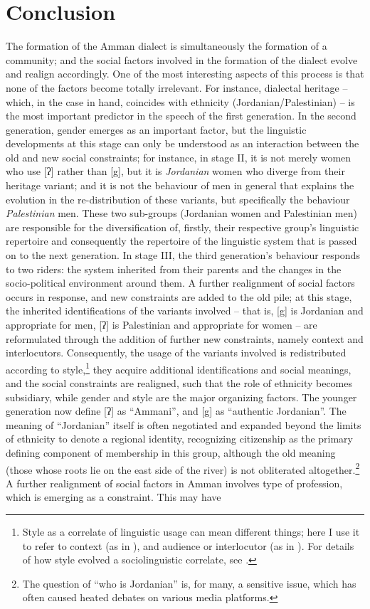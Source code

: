 \documentclass[output=paper]{langsci/langscibook}
\begin{document}
\section{Conclusion}

The formation of the Amman dialect is simultaneously the formation of a community; and the social factors involved in the formation of the dialect evolve and realign accordingly. One of the most interesting aspects of this process is that none of the factors become totally irrelevant. For instance, dialectal heritage – which, in the case in hand, coincides with ethnicity (Jordanian/Palestinian) – is the most important predictor in the speech of the first generation. In the second generation, gender emerges as an important factor, but the linguistic developments at this stage can only be understood as an interaction between the old and new social constraints; for instance, in stage II, it is not merely women who use [ʔ] rather than [g], but it is \textit{Jordanian} women who diverge from their heritage variant; and it is not the behaviour of men in general that explains the evolution in the re-distribution of these variants, but specifically the behaviour \textit{Palestinian} men. These two sub-groups (Jordanian women and Palestinian men) are responsible for the diversification of, firstly, their respective group’s linguistic repertoire and consequently the repertoire of the linguistic system that is passed on to the next generation. In stage III, the third generation’s behaviour responds to two riders: the system inherited from their parents and the changes in the socio-political environment around them. A further realignment of social factors occurs in response, and new constraints are added to the old pile; at this stage, the inherited identifications of the variants involved – that is, [g] is Jordanian and appropriate for men, [ʔ] is Palestinian and appropriate for women – are reformulated through the addition of further new constraints, namely context and interlocutors. Consequently, the usage of the variants involved is redistributed according to style,\footnote{Style as a correlate of linguistic usage can mean different things; here I use it to refer to context (as in \citealt{Labov1972}), and audience or interlocutor (as in \citealt{Bell1984}). For details of how style evolved a sociolinguistic correlate, see \citet{EckertRickford2001}.} they acquire additional identifications and social meanings, and the social constraints are realigned, such that the role of ethnicity becomes subsidiary, while gender and style are the major organizing factors. The younger generation now define [ʔ] as ``Ammani'', and [g] as ``authentic Jordanian''. The meaning of ``Jordanian'' itself is often negotiated and expanded beyond the limits of ethnicity to denote a regional identity, recognizing citizenship as the primary defining component of membership in this group, although the old meaning (those whose roots lie on the east side of the river) is not obliterated altogether.\footnote{The question of “who is Jordanian” is, for many, a sensitive issue, which has often caused heated debates on various media platforms.} A further realignment of social factors in Amman involves type of profession, which is emerging as a constraint. This may have 
\end{document}
